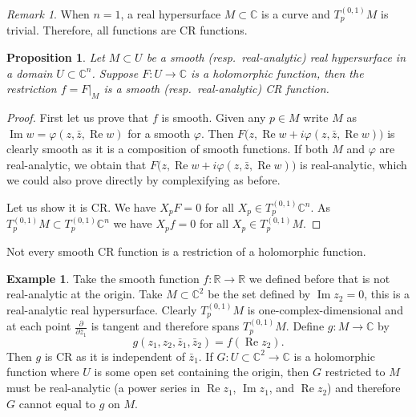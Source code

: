 \documentclass[12pt,openany]{book}
\renewcommand{\Re}{\operatorname{Re}}
\renewcommand{\Im}{\operatorname{Im}}
\newcommand{\C}{{\mathbb{C}}}
\newcommand{\R}{{\mathbb{R}}}
\theoremstyle{plain}
\newtheorem{prop}[thm]{Proposition}
\theoremstyle{remark}
\newtheorem{remark}[thm]{Remark}
\theoremstyle{definition}
\theoremstyle{exercise}
\theoremstyle{example}
\newtheorem{example}[thm]{Example}
\begin{document}
\begin{remark}
When $n=1$, a real hypersurface $M \subset \C$ is a curve and $T^{(0,1)}_p M$
is trivial.  Therefore, all functions are CR functions.
\end{remark}

\begin{prop}
Let $M \subset U$ be a smooth (resp.\ real-analytic) real hypersurface in a domain $U
\subset \C^n$.  Suppose $F \colon U \to \C$ is a holomorphic function,
then the restriction $f = F|_M$ is a smooth (resp.\ real-analytic) CR function.
\end{prop}

\begin{proof}
First let us prove that $f$ is smooth.  Given any $p \in M$ write $M$
as $\Im w = \varphi(z,\bar{z},\Re w)$ for a smooth $\varphi$.
Then $F\bigl(z,\Re w + i \varphi(z,\bar{z},\Re w) \bigr)$
is clearly smooth as it is a composition of smooth functions.
If both $M$ and $\varphi$ are real-analytic, we obtain that 
$F\bigl(z,\Re w + i \varphi(z,\bar{z},\Re w) \bigr)$ is real-analytic, which
we could also prove directly by complexifying as before.

Let us show it is CR\@.
We have $X_p F = 0$
for all $X_p \in T_p^{(0,1)} \C^n$.
As $T_p^{(0,1)} M \subset T_p^{(0,1)} \C^n$ we have
$X_p f = 0$ for all $X_p \in T_p^{(0,1)} M$.
\end{proof}

Not every smooth CR function is a restriction of a holomorphic function.

\begin{example}
Take the smooth function $f \colon \R \to \R$ we defined before
that is not real-analytic at the origin.
Take $M \subset \C^2$ be the set defined by $\Im z_2 = 0$, this is a
real-analytic real hypersurface.  Clearly
$T_p^{(0,1)} M$ is one-complex-dimensional and at each point
$\frac{\partial}{\partial \bar{z}_1}$ is tangent and therefore spans
$T_p^{(0,1)} M$.  Define $g \colon M \to \C$ by
\begin{equation*}
g(z_1,z_2,\bar{z}_1,\bar{z}_2) = f(\Re z_2) .
\end{equation*}
Then $g$ is CR as it is independent of $\bar{z}_1$.
If $G \colon U \subset \C^2 \to \C$ is a holomorphic
function where $U$ is some open set containing the origin, then $G$
restricted to $M$ must be real-analytic (a power series in $\Re z_1$, $\Im
z_1$, and $\Re z_2$) and therefore $G$ cannot equal to 
$g$ on $M$.
\end{example}
\end{document}
